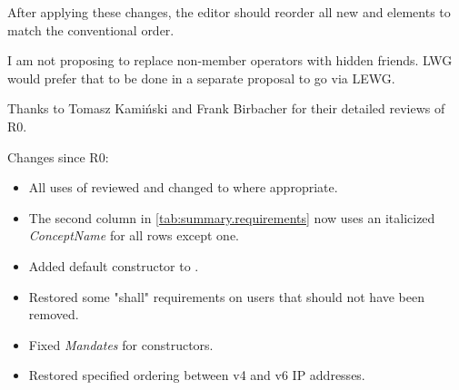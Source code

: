 After applying these changes, the editor should reorder all new
\constraints and \mandates elements to match the conventional order.

\vspace{1.5cm}

I am not proposing to replace non-member operators with hidden friends.
LWG would prefer that to be done in a separate proposal to go via LEWG.

Thanks to Tomasz Kamiński and Frank Birbacher for their detailed reviews of R0.

Changes since R0:
\begin{itemize}
\item All uses of  reviewed and changed to
   where appropriate.
\item The second column in \ref{tab:summary.requirements} now uses
  an italicized \textit{ConceptName} for all rows except one.
\item Added  default constructor to .
\item Restored some "shall" requirements on users that should not have been removed.
\item Fixed \textit{Mandates} for  constructors.
\item Restored specified ordering between v4 and v6 IP addresses.
\end{itemize}


\newpage


{}
\hypertarget{toctarget}{\tableofcontents*}

\setcounter{tocdepth}{5}

%
